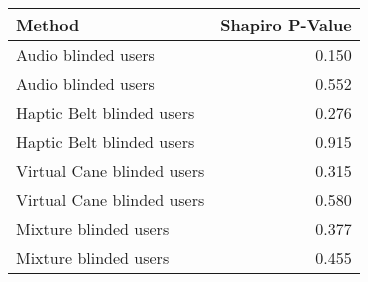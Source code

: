 
\centering
\begin{tabular}{lr}
\toprule
                    Method &  Shapiro P-Value \\
\midrule
       Audio blinded users &            0.150 \\
       Audio blinded users &            0.552 \\
 Haptic Belt blinded users &            0.276 \\
 Haptic Belt blinded users &            0.915 \\
Virtual Cane blinded users &            0.315 \\
Virtual Cane blinded users &            0.580 \\
     Mixture blinded users &            0.377 \\
     Mixture blinded users &            0.455 \\
\bottomrule
\end{tabular}
